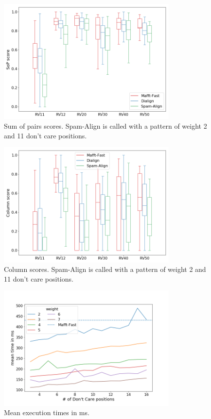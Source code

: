 \begin{figure}[h]
	\centering
	\includegraphics[width=0.8\textwidth]{../alignment-evaluation/sop-boxplot.png}
	\caption{Sum of pairs scores. Spam-Align is called with a pattern of weight 2 and 11 don't care positions.}
	\label{}
\end{figure}
\begin{figure}[h]
	\centering
	\includegraphics[width=0.8\textwidth]{../alignment-evaluation/cs-boxplot.png}
	\caption{Column scores. Spam-Align is called with a pattern of weight 2 and 11 don't care positions.}
	\label{}
\end{figure}

\begin{figure}[h]
	\centering
	\includegraphics[width=0.8\textwidth]{../alignment-evaluation/time-by-pattern-params.png}
	\caption{Mean execution times in ms.}
	\label{}
\end{figure}
